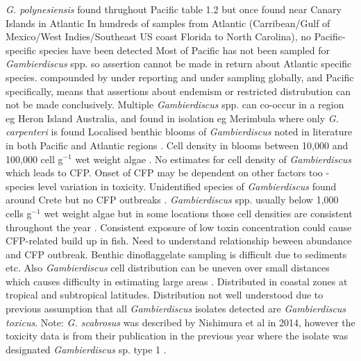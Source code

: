 \documentclass[12pt]{article}
\begin{document}
\emph{G. polynesiensis} found thrughout Pacific table 1.2 but once found near Canary Islands in Atlantic \cite{fraga2011gambierdiscus}
In hundreds of samples from Atlantic (Carribean/Gulf of Mexico/West Indies/Southeast US coast Florida to North Carolina), no Pacific-specific species have been detected \cite{berdalet2012global,litaker2010global}
Most of Pacific has not been sampled for \emph{Gambierdiscus} spp. so assertion cannot be made in return about Atlantic specific species.
compounded by under reporting and under sampling globally, and Pacific specifically, means that assertions about endemism or restricted distrubution can not be made conclusively.
Multiple \emph{Gambierdiscus} spp. can co-occur in a region eg Heron Island Australia, and found in isolation eg Merimbula where only \emph{G. carpenteri} is found %
Localised benthic blooms of \emph{Gambierdiscus} noted in literature in both Pacific and Atlantic regions \cite{nakajima1981toxicity,withers1984ciguatera,chinain1999seasonal,darius2007ciguatera}.
Cell density in blooms between 10,000 and 100,000 cell g$^{-1}$ wet weight algae \cite{litaker2010global}. No estimates for cell density of \emph{Gambierdiscus} which leads to CFP. Onset of CFP may be dependent on other factors too - species level variation in toxicity. Unidentified species of \emph{Gambierdiscus} found around Crete but no CFP outbreaks \cite{caillaud2010update}.
\emph{Gambierdiscus} spp. usually below 1,000 cells g$^{-1}$ wet weight algae \cite{litaker2010global} but in some locations those cell densities are consistent throughout the year \cite{chinain1999seasonal}.
Consistent exposure of low toxin concentration could cause CFP-related build up in fish. Need to understand relationship beween abundance and CFP outbreak. Benthic dinoflaggelate sampling is difficult due to sediments etc. Also \emph{Gambierdiscus} cell distribution can be uneven over small distances which causes difficulty in estimating large areas \cite{lobel1988assessment,ballantine1988population,litaker2010global}.
Distributed in coastal zones at tropical and subtropical latitudes.
Distribution not well understood due to previous assumption that all \emph{Gambierdiscus} isolates detected are \emph{Gambierdiscus toxicus}.
Note: \emph{G. scabrosus} was described by Nishimura et al in 2014, however the toxicity data is from their publication in the previous year where the isolate was designated \emph{Gambierdiscus} sp. type 1 \cite{nishimura2013genetic,nishimura2014morphology}.
\end{document}
